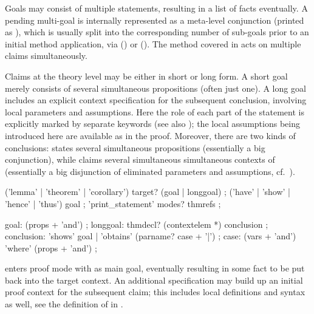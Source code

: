 \begin{isabellebody}
\begin{isamarkuptext}
  Goals may consist of multiple statements, resulting in a list of
  facts eventually.  A pending multi-goal is internally represented as
  a meta-level conjunction (printed as \isa{{\isacharampersand}{\isacharampersand}}), which is usually
  split into the corresponding number of sub-goals prior to an initial
  method application, via 
  () or 
  ().  The  method
  covered in  acts on multiple claims
  simultaneously.

  Claims at the theory level may be either in short or long form.  A
  short goal merely consists of several simultaneous propositions
  (often just one).  A long goal includes an explicit context
  specification for the subsequent conclusion, involving local
  parameters and assumptions.  Here the role of each part of the
  statement is explicitly marked by separate keywords (see also
  ); the local assumptions being introduced here
  are available as  in the proof.  Moreover, there
  are two kinds of conclusions:  states several
  simultaneous propositions (essentially a big conjunction), while
   claims several simultaneous simultaneous
  contexts of (essentially a big disjunction of eliminated parameters
  and assumptions, cf.\ ).

  \begin{rail}
    ('lemma' | 'theorem' | 'corollary') target? (goal | longgoal)
    ;
    ('have' | 'show' | 'hence' | 'thus') goal
    ;
    'print\_statement' modes? thmrefs
    ;
  
    goal: (props + 'and')
    ;
    longgoal: thmdecl? (contextelem *) conclusion
    ;
    conclusion: 'shows' goal | 'obtains' (parname? case + '|')
    ;
    case: (vars + 'and') 'where' (props + 'and')
    ;
  \end{rail}

  \begin{descr}
  
  \item [\isa{\isacommand{lemma}}~\isa{a{\isacharcolon}\ {\isasymphi}}] enters proof mode with
  \isa{{\isasymphi}} as main goal, eventually resulting in some fact \isa{{\isasymturnstile}\ {\isasymphi}} to be put back into the target context.  An additional
   specification may build up an initial proof
  context for the subsequent claim; this includes local definitions
  and syntax as well, see the definition of  in
  .
  

\end{descr}
\end{isamarkuptext}
\end{isabellebody}
